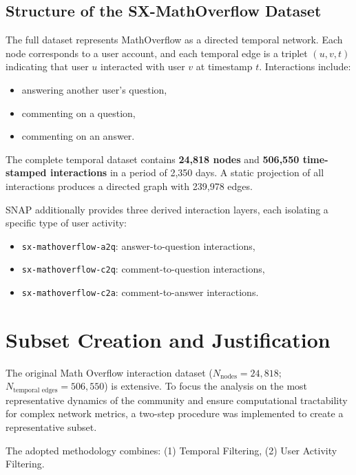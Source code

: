 \documentclass[sigplan]{acmart}
\begin{document}
    \subsection{Structure of the SX-MathOverflow Dataset}

        The full dataset represents MathOverflow as a directed temporal network. Each node corresponds to a user account, and each temporal edge is a triplet $(u, v, t)$ indicating that user $u$ interacted with user $v$ at timestamp $t$. Interactions include:
        \begin{itemize}
            \item answering another user's question,
            \item commenting on a question,
            \item commenting on an answer.
        \end{itemize}
        
        The complete temporal dataset contains \textbf{24,818 nodes} and \textbf{506,550 time-stamped interactions} in a period of 2,350 days. A static projection of all interactions produces a directed graph with 239,978 edges.
        
        SNAP additionally provides three derived interaction layers, each isolating a specific type of user activity:
        \begin{itemize}
            \item \texttt{sx-mathoverflow-a2q}: answer-to-question interactions,
            \item \texttt{sx-mathoverflow-c2q}: comment-to-question interactions,
            \item \texttt{sx-mathoverflow-c2a}: comment-to-answer interactions.
        \end{itemize}


\section{Subset Creation and Justification}\label{sec:subset-creation}

The original Math Overflow interaction dataset ($N_{\text{nodes}} = 24,818$; $N_{\text{temporal edges}} = 506,550$) is extensive. To focus the analysis on the most representative dynamics of the community and ensure computational tractability for complex network metrics, a two-step procedure was implemented to create a representative subset.

The adopted methodology combines: (1) Temporal Filtering, (2) User Activity Filtering.
\end{document}
